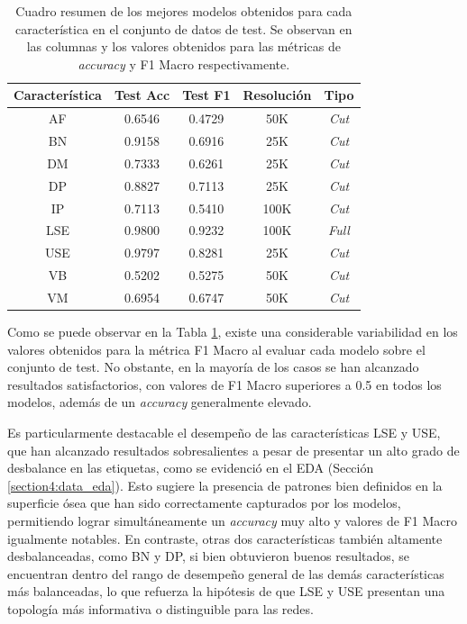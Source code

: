 \begin{table}[h]
    \centering
    \begin{tabular}{|c|c|c|c|c|}
    \hline
    \rowcolor[HTML]{D33333} 
    {\color[HTML]{FFFFFF} \textbf{Característica}} & {\color[HTML]{FFFFFF} \textbf{Test Acc}} & {\color[HTML]{FFFFFF} \textbf{Test F1}} & {\color[HTML]{FFFFFF} \textbf{Resolución}} & {\color[HTML]{FFFFFF} \textbf{Tipo}} \\ \hline
    AF & 0.6546 & 0.4729 & 50K & \textit{Cut} \\
    BN & 0.9158 & 0.6916 & 25K & \textit{Cut} \\
    DM & 0.7333 & 0.6261 & 25K & \textit{Cut} \\
    DP & 0.8827 & 0.7113 & 25K & \textit{Cut} \\
    IP & 0.7113 & 0.5410 & 100K & \textit{Cut} \\
    LSE & 0.9800 & 0.9232 & 100K & \textit{Full} \\
    USE & 0.9797 & 0.8281 & 25K & \textit{Cut} \\
    VB & 0.5202 & 0.5275 & 50K & \textit{Cut} \\
    VM & 0.6954 & 0.6747 & 50K & \textit{Cut} \\ \hline
    \end{tabular}
    \caption[Cuadro resumen de los mejores modelos obtenidos para cada característica]{Cuadro resumen de los mejores modelos obtenidos para cada característica en el conjunto de datos de test. Se observan en las columnas  y  los valores obtenidos para las métricas de \textit{accuracy} y F1 Macro respectivamente.}
    \label{table5:single_tag__results}
\end{table}

Como se puede observar en la Tabla \ref{table5:single_tag__results}, existe una considerable variabilidad en los valores obtenidos para la métrica F1 Macro al evaluar cada modelo sobre el conjunto de test. No obstante, en la mayoría de los casos se han alcanzado resultados satisfactorios, con valores de F1 Macro superiores a 0.5 en todos los modelos, además de un \textit{accuracy} generalmente elevado.

Es particularmente destacable el desempeño de las características LSE y USE, que han alcanzado resultados sobresalientes a pesar de presentar un alto grado de desbalance en las etiquetas, como se evidenció en el EDA (Sección \ref{section4:data_eda}). Esto sugiere la presencia de patrones bien definidos en la superficie ósea que han sido correctamente capturados por los modelos, permitiendo lograr simultáneamente un \textit{accuracy} muy alto y valores de F1 Macro igualmente notables. En contraste, otras dos características también altamente desbalanceadas, como BN y DP, si bien obtuvieron buenos resultados, se encuentran dentro del rango de desempeño general de las demás características más balanceadas, lo que refuerza la hipótesis de que LSE y USE presentan una topología más informativa o distinguible para las redes.

